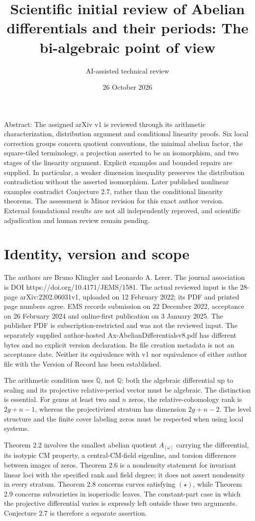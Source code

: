 \documentclass[10pt]{article}
\title{Scientific initial review of
Abelian differentials and their periods:
The bi-algebraic point of view}
\author{AI-assisted technical review}
\date{26 October 2026}
\begin{document}
\maketitle
Abstract: The assigned arXiv v1 is reviewed through its arithmetic characterization, distribution argument and conditional linearity proofs. Six local correction groups concern quotient conventions, the minimal abelian factor, the square-tiled terminology, a projection asserted to be an isomorphism, and two stages of the linearity argument. Explicit examples and bounded repairs are supplied. In particular, a weaker dimension inequality preserves the distribution contradiction without the asserted isomorphism. Later published nonlinear examples contradict Conjecture 2.7, rather than the conditional linearity theorems. The assessment is Minor revision for this exact author version. External foundational results are not all independently reproved, and scientific adjudication and human review remain pending.\par
\section*{Identity, version and scope}
The authors are Bruno Klingler and Leonardo A. Lerer. The journal association is DOI https://doi.org/10.4171/JEMS/1581. The actual reviewed input is the 28-page arXiv:2202.06031v1, uploaded on 12 February 2022; its PDF and printed page numbers agree. EMS records submission on 22 December 2022, acceptance on 26 February 2024 and online-first publication on 3 January 2025. The publisher PDF is subscription-restricted and was not the reviewed input. The separately supplied author-hosted Ax-AbelianDifferentialsv8.pdf has different bytes and no explicit version declaration. Its file creation metadata is not an acceptance date. Neither its equivalence with v1 nor equivalence of either author file with the Version of Record has been established.\par
The arithmetic condition uses \(\overline{\mathbb Q}\), not \(\mathbb Q\): both the algebraic differential up to scaling and its projective relative-period vector must be algebraic. The distinction is essential. For genus at least two and \(n\) zeros, the relative-cohomology rank is \(2g+n-1\), whereas the projectivized stratum has dimension \(2g+n-2\). The level structure and the finite cover labeling zeros must be respected when using local systems.\par
Theorem 2.2 involves the smallest abelian quotient \(A_{[\omega]}\) carrying the differential, its isotypic CM property, a central-CM-field eigenline, and torsion differences between images of zeros. Theorem 2.6 is a nondensity statement for invariant linear loci with the specified rank and field degree; it does not assert nondensity in every stratum. Theorem 2.8 concerns curves satisfying \((\star)\), while Theorem 2.9 concerns subvarieties in isoperiodic leaves. The constant-part case in which the projective differential varies is expressly left outside those two arguments. Conjecture 2.7 is therefore a separate assertion.\par
\end{document}
